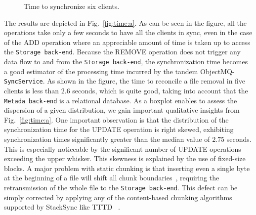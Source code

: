\begin{figure}[t]
  \centering
  \caption{Time to synchronize six clients.}
  \vspace{-5pt}
  \label{fig:time}
\end{figure}

The results are depicted in Fig.~\ref{fig:time:a}. As can be seen in the figure, all the operations take
only a few seconds to have all the clients in sync, even in the case of the ADD operation where an appreciable
amount of time is taken up to access the \texttt{Storage back-end}. Because the REMOVE operation does not trigger any data flow to and from the
\texttt{Storage back-end}, the synchronization time becomes a good estimator of the processing time
incurred by the tandem ObjectMQ-\texttt{SyncService}. As shown in the figure, the time to reconcile
a file removal in five clients is less than $2.6$ seconds, which is quite good, taking into account that the
\texttt{Metada back-end} is a relational database.
As a boxplot enables to assess the dispersion of a given distribution, we gain important qualitative
insights from Fig.~\ref{fig:time:a}. One important observation is that the distribution of the
synchronization time for the UPDATE operation is right skewed, exhibiting synchronization times
significantly greater than the median value of $2.75$ seconds. This is especially noticeable by
the significant number of UPDATE operations exceeding the upper whisker. This skewness is explained
by the use of fixed-size blocks. A major problem with static chunking is that inserting even a
single byte at the beginning of a file will shift all chunk boundaries~\cite{Eshghi05}, requiring
the retransmission of the whole file to the \texttt{Storage back-end}. This defect can be simply
corrected by applying any of the content-based chunking algorithms supported by StackSync like
TTTD ~\cite{Eshghi05}.

